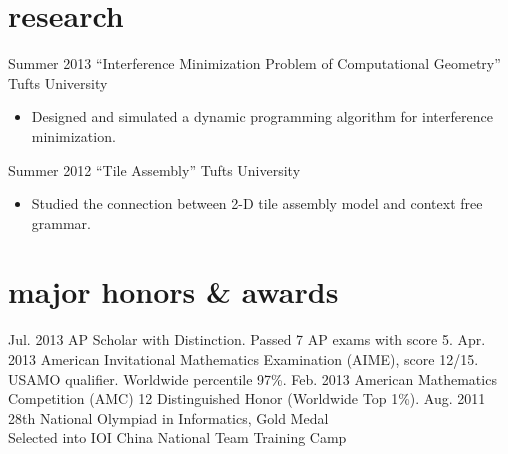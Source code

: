 \documentclass[]{friggeri-cv} %
\newenvironment{citemize}{\begin{itemize}[leftmargin=12pt]\vspace{-10pt}}{\end{itemize}}
\begin{document}

\section{research}

\begin{entrylist}
  \entry
  {Summer 2013}
  {``Interference Minimization Problem of Computational Geometry''}
  {Tufts University}
  {\begin{citemize}
    \item{Designed and simulated a dynamic programming algorithm for interference minimization. }
  \end{citemize}}
  \entry
  {Summer 2012}
  {``Tile Assembly''}
  {Tufts University}
  {\begin{citemize}
    \item{Studied the connection between 2-D tile assembly model and context free grammar. }
  \end{citemize}}
\end{entrylist}



\section{major honors \& awards}

\begin{entrylist}
  \centry
  {Jul. 2013}
  {AP Scholar with Distinction. Passed 7 AP exams with score 5. }
  \centry
  {Apr. 2013}
  {American Invitational Mathematics Examination (AIME), score 12/15. USAMO qualifier. Worldwide percentile 97\%. }
  \centry
  {Feb. 2013}
  {American Mathematics Competition (AMC) 12 Distinguished Honor (Worldwide Top 1\%). }
  \centry
  {Aug. 2011}
  {28th National Olympiad in Informatics, Gold Medal \\
  Selected into IOI China National Team Training Camp}
\end{entrylist}
\end{document}
